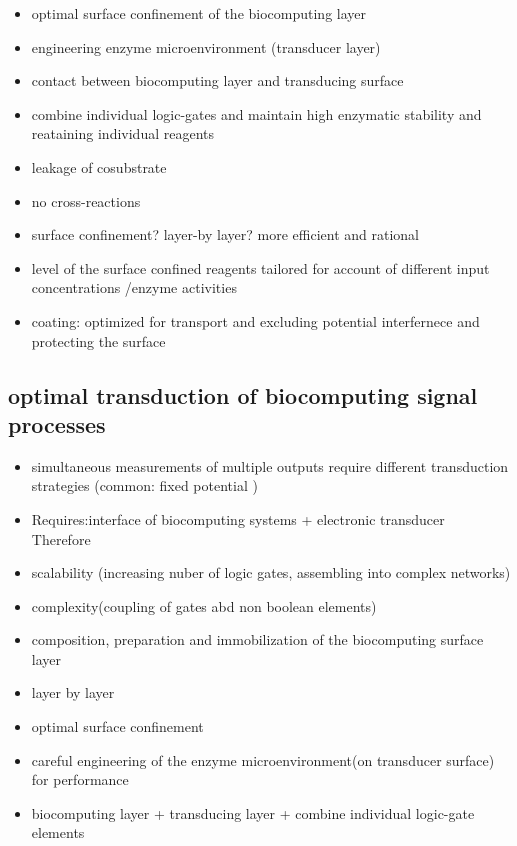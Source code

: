 \documentclass[runningheads]{llncs}
\begin{document}
	
	
	\begin{itemize}
		\item optimal surface confinement of the biocomputing layer
		\item engineering enzyme microenvironment (transducer layer)
		\item contact between biocomputing layer and transducing surface
		\item combine individual logic-gates and maintain high enzymatic stability and reataining individual reagents
		\item leakage of cosubstrate 
		\item no cross-reactions
		\item surface confinement? layer-by layer? more efficient and rational 
		\item level of the surface confined reagents tailored for account of different input concentrations /enzyme activities 
		\item coating: optimized for transport and excluding potential interfernece and protecting the surface
	\end{itemize}

\subsection{optimal transduction of biocomputing signal processes}
	\begin{itemize}
		\item simultaneous measurements of multiple outputs require different transduction strategies (common: fixed potential )
	\end{itemize}
	\begin{itemize}
		\item Requires:interface of biocomputing systems + electronic transducer\\
		Therefore
		\item scalability (increasing nuber of logic gates, assembling into complex networks)
		\item complexity(coupling of gates abd non boolean elements)
		\item composition, preparation and immobilization of the biocomputing surface layer
		\item layer by layer
		\item optimal surface confinement 
		\item careful engineering of the enzyme microenvironment(on transducer surface) for performance
		\item biocomputing layer + transducing layer + combine individual logic-gate elements	
	\end{itemize}
\end{document}
